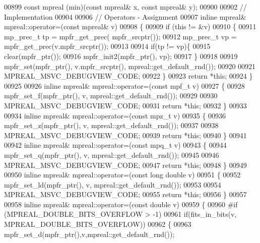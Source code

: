 \begin{DoxyCode}
00899 \textcolor{keyword}{const} mpreal (min)(\textcolor{keyword}{const} mpreal& x, \textcolor{keyword}{const} mpreal& y);
00900 
00902 \textcolor{comment}{// Implementation}
00904 \textcolor{comment}{}
00906 \textcolor{comment}{// Operators - Assignment}
00907 \textcolor{keyword}{inline} mpreal& mpreal::operator=(\textcolor{keyword}{const} mpreal& v)
00908 \{
00909     \textcolor{keywordflow}{if} (\textcolor{keyword}{this} != &v)
00910     \{
00911     mp\_prec\_t tp = mpfr\_get\_prec(  mpfr\_srcptr());
00912     mp\_prec\_t vp = mpfr\_get\_prec(v.mpfr\_srcptr());
00913 
00914     \textcolor{keywordflow}{if}(tp != vp)\{
00915       clear(mpfr\_ptr());
00916       mpfr\_init2(mpfr\_ptr(), vp);
00917     \}
00918 
00919         mpfr\_set(mpfr\_ptr(), v.mpfr\_srcptr(), mpreal::get\_default\_rnd());
00920 
00921         MPREAL\_MSVC\_DEBUGVIEW\_CODE;
00922     \}
00923     \textcolor{keywordflow}{return} *\textcolor{keyword}{this};
00924 \}
00925 
00926 \textcolor{keyword}{inline} mpreal& mpreal::operator=(\textcolor{keyword}{const} mpf\_t v)
00927 \{
00928     mpfr\_set\_f(mpfr\_ptr(), v, mpreal::get\_default\_rnd());
00929 
00930     MPREAL\_MSVC\_DEBUGVIEW\_CODE;
00931     \textcolor{keywordflow}{return} *\textcolor{keyword}{this};
00932 \}
00933 
00934 \textcolor{keyword}{inline} mpreal& mpreal::operator=(\textcolor{keyword}{const} mpz\_t v)
00935 \{
00936     mpfr\_set\_z(mpfr\_ptr(), v, mpreal::get\_default\_rnd());
00937 
00938     MPREAL\_MSVC\_DEBUGVIEW\_CODE;
00939     \textcolor{keywordflow}{return} *\textcolor{keyword}{this};
00940 \}
00941 
00942 \textcolor{keyword}{inline} mpreal& mpreal::operator=(\textcolor{keyword}{const} mpq\_t v)
00943 \{
00944     mpfr\_set\_q(mpfr\_ptr(), v, mpreal::get\_default\_rnd());
00945 
00946     MPREAL\_MSVC\_DEBUGVIEW\_CODE;
00947     \textcolor{keywordflow}{return} *\textcolor{keyword}{this};
00948 \}
00949 
00950 \textcolor{keyword}{inline} mpreal& mpreal::operator=(\textcolor{keyword}{const} \textcolor{keywordtype}{long} \textcolor{keywordtype}{double} v)
00951 \{
00952     mpfr\_set\_ld(mpfr\_ptr(), v, mpreal::get\_default\_rnd());
00953 
00954     MPREAL\_MSVC\_DEBUGVIEW\_CODE;
00955     \textcolor{keywordflow}{return} *\textcolor{keyword}{this};
00956 \}
00957 
00958 \textcolor{keyword}{inline} mpreal& mpreal::operator=(\textcolor{keyword}{const} \textcolor{keywordtype}{double} v)
00959 \{
00960 \textcolor{preprocessor}{#if (MPREAL\_DOUBLE\_BITS\_OVERFLOW > -1)}
00961   \textcolor{keywordflow}{if}(fits\_in\_bits(v, MPREAL\_DOUBLE\_BITS\_OVERFLOW))
00962   \{
00963     mpfr\_set\_d(mpfr\_ptr(),v,mpreal::get\_default\_rnd());

\end{DoxyCode}
